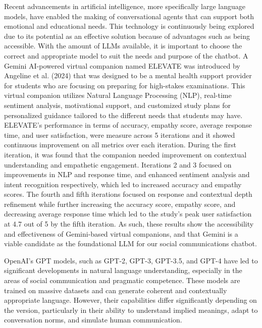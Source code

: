 Recent advancements in artificial intelligence, more specifically large language models, have enabled the making of conversational agents that can support both emotional and educational needs.  This technology is continuously being explored due to its potential as an effective solution because of advantages such as being accessible.  With the amount of LLMs available, it is important to choose the correct and appropriate model to suit the needs and purpose of the chatbot.
A Gemini AI-powered virtual companion named ELEVATE was introduced by Angeline et al. (2024) that was designed to be a mental health support provider for students who are focusing on preparing for high-stakes examinations. This virtual companion utilizes Natural Language Processing (NLP), real-time sentiment analysis, motivational support, and customized study plans for personalized guidance tailored to the different needs that students may have. ELEVATE’s performance in terms of accuracy, empathy score, average response time, and user satisfaction, were measure across 5 iterations and it showed continuous improvement on all metrics over each iteration. During the first iteration, it was found that the companion needed improvement on contextual understanding and empathetic engagement. Iterations 2 and 3 focused on improvements in NLP and response time, and enhanced sentiment analysis and intent recognition respectively, which led to increased accuracy and empathy scores. The fourth and fifth iterations focused on response and contextual depth refinement while further increasing the accuracy score, empathy score, and decreasing average response time which led to the study’s peak user satisfaction at 4.7 out of 5 by the fifth iteration. As such, these results show the accessibility and effectiveness of Gemini-based virtual companions, and that Gemini is a viable candidate as the foundational LLM for our social communications chatbot.

OpenAI’s GPT models, such as GPT-2, GPT-3, GPT-3.5, and GPT-4 have led to significant developments in natural language understanding, especially in the areas of social communication and pragmatic competence. These models are trained on massive datasets and can generate coherent and contextually appropriate language. However, their capabilities differ significantly depending on the version, particularly in their ability to understand implied meanings, adapt to conversation norms, and simulate human communication.

